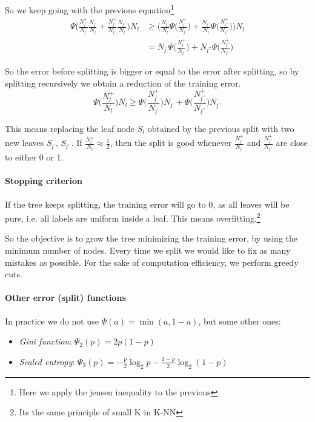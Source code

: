 So we keep going with the previous equation\footnote{Here we apply the jensen inequality
to the previous}
\begin{equation}
    \begin{aligned}
        \Psi\bigg(\frac{N_{l^\prime}^+}{N_{l^\prime}}
    \frac{N_{l^\prime}}{N_l}+\frac{N_{l^{\prime\prime}}^+}{N_{l^{\prime\prime}}}
    \frac{N_{l^{\prime\prime}}}{N_l}
    \bigg)N_l &\geq 
    \bigg(\frac{N_{l^\prime}}{N_l}\Psi\bigg(\frac{N_{l^\prime}^+}{N_{l^\prime}}
    \bigg) + \frac{N_{l^{\prime\prime}}}{N_l}\Psi\bigg(\frac{N_{l^{\prime\prime}}^+}{N_{l^{\prime\prime}}}\bigg)\bigg)N_l\\
    &= N_{l^\prime}\Psi\bigg(\frac{N_{l^\prime}^+}{N_{l^\prime}}
    \bigg) + N_{l^{\prime\prime}}\Psi\bigg(\frac{N_{l^{\prime\prime}}^+}{N_{l^{\prime\prime}}}\bigg)
    \end{aligned}
\end{equation}

So the error before splitting is bigger or equal 
to the error after splitting, so by splitting recursively we 
obtain a reduction of the training error.
$$\Psi\bigg(\frac{N_l^+}{N_l}\bigg)N_l \geq 
\Psi\bigg(\frac{N_{l^\prime}^+}{N_{l^\prime}}
    \bigg)N_{l^\prime} + \Psi\bigg(\frac{N_{l^{\prime\prime}}^+}{N_{l^{\prime\prime}}}\bigg)N_{l^{\prime\prime}}$$

This means replacing the leaf node $S_l$ obtained by the previous split 
with two new leaves $S_{l^\prime}$, $S_{l^{\prime\prime}}$.
If $\frac{N_l^+}{N_l} \approx \frac{1}{2}$, then the split is good whenever 
$\frac{N_{l^\prime}^+}{N_{l^\prime}}$ and 
$\frac{N_{l^{\prime\prime}}^+}{N_{l^{\prime\prime}}}$ are close to either 0 or 1.

\paragraph{Stopping criterion}
If the tree keeps splitting, the training error will go to 0, as 
all leaves will be pure, i.e. all labels are uniform inside a leaf.
This means overfitting.\footnote{Its the same principle of small K in K-NN}

So the objective is to grow the tree minimizing the training error, by 
using the minimum number of nodes. Every time we split we would like 
to fix as many mistakes as possible. For the sake of computation efficiency, 
we perform greedy cuts.

\paragraph{Other error (split) functions}
In practice we do not use $\Psi(a) = \min(a, 1-a)$, but some other ones:
\begin{itemize}
    \item \emph{Gini function}: $\Psi_2(p) = 2p(1-p)$
    \item \emph{Scaled entropy}: $\Psi_3(p) = -\frac{p}{2}\log_2 p - \frac{1-p}{2}\log_2(1-p)$
\end{itemize}

